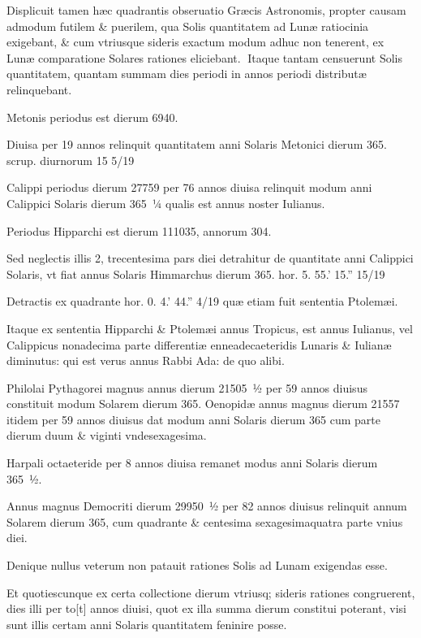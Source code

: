 \begin{parnumbers}

Displicuit tamen hæc quadrantis obseruatio Græcis Astronomis, propter causam admodum futilem  \& puerilem, qua Solis quantitatem ad Lunæ ratiocinia exigebant, \& cum vtriusque sideris exactum modum adhuc non tenerent, ex Lunæ comparatione Solares rationes eliciebant.
Itaque tantam censuerunt Solis quantitatem, quantam summam dies periodi in annos periodi distributæ relinquebant.

Metonis periodus est dierum 6940.

Diuisa per 19 annos relinquit quantitatem anni Solaris Metonici dierum 365. scrup. diurnorum 15 5/19

Calippi periodus dierum 27759 per 76 annos diuisa relinquit modum anni Calippici Solaris dierum 365 ¼ qualis est annus noster Iulianus.

Periodus Hipparchi est dierum 111035, annorum 304.

Sed neglectis illis 2, trecentesima pars diei detrahitur de quantitate anni Calippici Solaris,  vt fiat annus Solaris Himmarchus dierum 365. hor. 5. 55.' 15.'' 15/19

Detractis ex quadrante hor. 0. 4.' 44.'' 4/19 quæ etiam fuit sententia Ptolemæi.

Itaque ex sententia Hipparchi \& Ptolemæi annus Tropicus, est annus Iulianus, vel Calippicus nonadecima parte differentiæ enneadecaeteridis Lunaris \& Iulianæ diminutus: qui est verus annus Rabbi Ada: de quo alibi.

Philolai Pythagorei magnus annus dierum 21505 ½ per 59 annos diuisus constituit modum Solarem dierum 365. Oenopidæ annus magnus dierum 21557 itidem per 59 annos diuisus dat modum anni Solaris dierum 365 cum parte dierum duum \& viginti vndesexagesima.

Harpali octaeteride per 8 annos diuisa remanet modus anni Solaris dierum 365 ½.

Annus magnus  Democriti dierum 29950 ½ per 82 annos diuisus relinquit annum Solarem dierum 365, cum quadrante \& centesima sexagesimaquatra parte vnius diei.

Denique nullus veterum non patauit rationes Solis ad Lunam exigendas esse.

Et quotiescunque ex certa collectione dierum vtriusq; sideris rationes congruerent, dies illi per to[t] annos diuisi, quot ex illa summa dierum constitui poterant, visi sunt illis certam anni Solaris quantitatem feninire posse.


\end{parnumbers}

